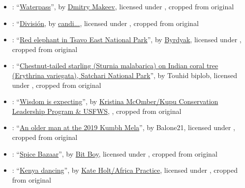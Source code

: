 \begin{itemize}
\item {}: ``\href{https://commons.wikimedia.org/wiki/File:Waterpass.jpg}{Waterpass}'', by \href{https://commons.wikimedia.org/wiki/User:Knopik-som}{Dmitry Makeev}, licensed under , cropped from original

\item {}: ``\href{https://www.flickr.com/photos/candibj/48576057741/}{Divisi\'{o}n}, by \href{https://www.flickr.com/photos/candibj/}{candi...}, licensed under , cropped from original

\item {}: ``\href{https://commons.wikimedia.org/wiki/File:Red_elephant_in_dirt.jpg}{Red elephant in Tsavo East National Park}'', by \href{https://commons.wikimedia.org/wiki/User:Byrdyak}{Byrdyak}, licensed under , cropped from original

\item {}: ``\href{https://commons.wikimedia.org/wiki/File:Chestnut-tailed_starling_-_%E0%A6%95%E0%A6%BE%E0%A6%A0_%E0%A6%B6%E0%A6%BE%E0%A6%B2%E0%A6%BF%E0%A6%95.jpg}{Chestnut-tailed starling (Sturnia malabarica) on Indian coral tree (Erythrina variegata), Satchari National Park}'', by Touhid biplob, licensed under \CCBYSA{4.0}, cropped from original

\item {}: ``\href{https://www.flickr.com/photos/usfwspacific/31368620171/in/album-72157632891366006/}{Wisdom is expecting}'', by \href{https://www.flickr.com/people/usfwspacific/}{Kristina McOmber/Kupu Conservation Leadership Program \& USFWS}, , cropped from original

\item {}: ``\href{https://commons.wikimedia.org/wiki/File:2019_Jan_15_-_Prayagraj_Kumbh_Mela_-_Portrait_of_an_Older_Man.jpg}{An older man at the 2019 Kumbh Mela}'', by Balone21, licensed under , cropped from original

\item {}: ``\href{https://www.flickr.com/photos/bitboy/7634965560/}{Spice Bazaar}'', by \href{https://www.flickr.com/people/bitboy/}{Bit Boy}, licensed under , cropped from original

\item {}: ``\href{https://www.flickr.com/photos/dfataustralianaid/10706364576/in/album-72157637430496785/}{Kenya dancing}'', by \href{https://www.flickr.com/people/dfataustralianaid/}{Kate Holt/Africa Practice}, licensed under , cropped from original


\end{itemize}
